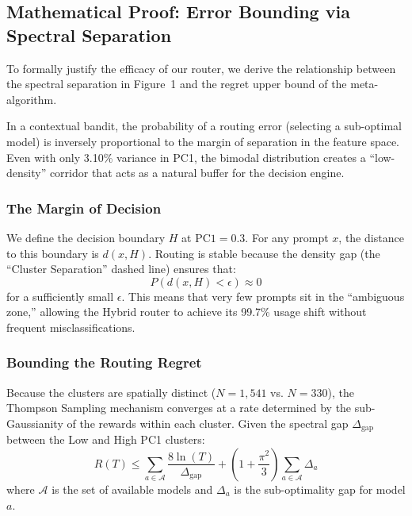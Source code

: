 \subsection{Mathematical Proof: Error Bounding via Spectral Separation}
\label{appendix:spectral_separation}

To formally justify the efficacy of our router, we derive the relationship between the spectral separation in Figure~1 and the regret upper bound of the meta-algorithm.

In a contextual bandit, the probability of a routing error (selecting a sub-optimal model) is inversely proportional to the margin of separation in the feature space. Even with only 3.10\% variance in PC1, the bimodal distribution creates a ``low-density'' corridor that acts as a natural buffer for the decision engine.

\subsubsection{The Margin of Decision}

We define the decision boundary $H$ at $\text{PC1} = 0.3$. For any prompt $x$, the distance to this boundary is $d(x, H)$. Routing is stable because the density gap (the ``Cluster Separation'' dashed line) ensures that:
\begin{equation}
P(d(x, H) < \epsilon) \approx 0
\end{equation}
for a sufficiently small $\epsilon$. This means that very few prompts sit in the ``ambiguous zone,'' allowing the Hybrid router to achieve its 99.7\% usage shift without frequent misclassifications.

\subsubsection{Bounding the Routing Regret}

Because the clusters are spatially distinct ($N=1{,}541$ vs. $N=330$), the Thompson Sampling mechanism converges at a rate determined by the sub-Gaussianity of the rewards within each cluster. Given the spectral gap $\Delta_{\text{gap}}$ between the Low and High PC1 clusters:
\begin{equation}
R(T) \le \sum_{a \in \mathcal{A}} \frac{8 \ln(T)}{\Delta_{\text{gap}}} + \left(1 + \frac{\pi^2}{3}\right) \sum_{a \in \mathcal{A}} \Delta_a
\end{equation}
where $\mathcal{A}$ is the set of available models and $\Delta_a$ is the sub-optimality gap for model $a$.

